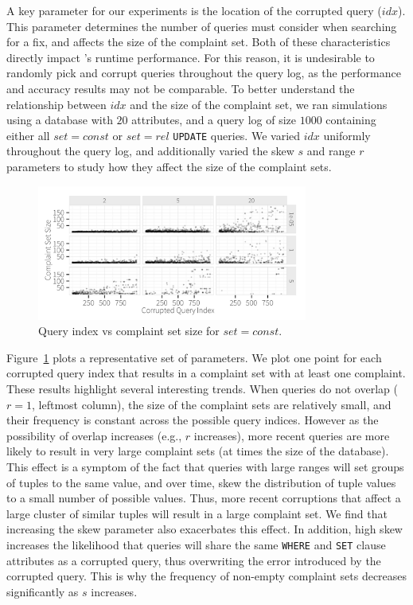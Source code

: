 A key parameter for our experiments is the location of the corrupted query ($idx$).  
This parameter determines the number of queries \sys must consider when searching for a fix,
and affects the size of the complaint set.  
Both of these characteristics directly impact \sys's 
runtime performance. For this reason, it is undesirable to randomly pick and corrupt queries
throughout the query log, as the performance and accuracy results may not be comparable. 
To better understand the relationship between $idx$ and the size of the complaint set, we ran
simulations using a database with $20$ attributes, and a query log of size $1000$ containing
either all $set = const$ or $set = rel$ \texttt{UPDATE} queries.
We varied  $idx$ uniformly throughout the query log, and additionally varied
the skew $s$ and range $r$ parameters to study how they affect the size of the complaint sets.


  \begin{figure}[h]
  \centering
  \includegraphics[width = 3.5in]{figures/qidxsimulation/qidx_v_ncomplaints_20attrs_const}
  \caption{Query index vs complaint set size for $set = const$.}
  \label{f:qidx_v_ncomplaints_const} 
  \end{figure}


Figure~\ref{f:qidx_v_ncomplaints_const} plots a representative set of parameters.  We plot one point
for each corrupted query index that results in a complaint set with at least one complaint. 
These results highlight several interesting trends.  When queries do not overlap ($r = 1$, leftmost column),
the size of the complaint sets are relatively small, and their frequency is constant across the possible query indices.
However as the possibility of overlap increases (e.g., $r$ increases), more recent queries are more likely to result in
very large complaint sets (at times the size of the database).   
This effect is a symptom of the fact that queries with large ranges will set groups of tuples to the same value,
and over time, skew the distribution of tuple values to a small number of possible values.
Thus, more recent corruptions that affect a large cluster of similar tuples will result in a large complaint set.
We find that increasing the skew parameter also exacerbates this effect.  
In addition, high skew increases the likelihood that queries will share the same \texttt{WHERE} and \texttt{SET} clause 
attributes as a corrupted query, thus overwriting the error introduced by the corrupted query.  
This is why the frequency of non-empty complaint sets decreases significantly as $s$ increases.


